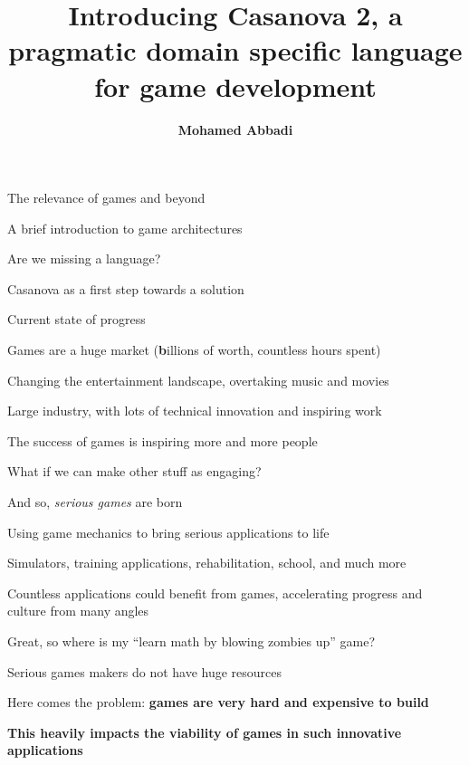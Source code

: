 \documentclass{beamer}
\title{Introducing Casanova 2, a pragmatic domain specific language for game development}
\author{\textbf{Mohamed Abbadi}}
\institute{\textbf{Ca'Foscari University}\\ 
Venice, Italy\\
\textbf{Tilburg University}\\
Tilburg, Netherlands}
\date{}
\begin{document}
\maketitle

\begin{slide}{
\item The relevance of games and beyond
\item A brief introduction to game architectures
\item Are we missing a language?
\item Casanova as a first step towards a solution
\item Current state of progress
}\end{slide}

\begin{slide}{
\item Games are a huge market (\textbf{b}illions of worth, countless hours spent)
\item Changing the entertainment landscape, overtaking music and movies
\item Large industry, with lots of technical innovation and inspiring work
}\end{slide}

\begin{slide}{
\item The success of games is inspiring more and more people
\item What if we can make other stuff as engaging?
\item And so, \textit{serious games} are born
}\end{slide}

\begin{slide}{
\item Using game mechanics to bring serious applications to life
\item Simulators, training applications, rehabilitation, school, and much more
\item Countless applications could benefit from games, accelerating progress and culture from many angles
}\end{slide}

\begin{slide}{
\item Great, so where is my ``learn math by blowing zombies up'' game?
\item Serious games makers do not have huge resources
\item Here comes the problem: \textbf{games are very hard and expensive to build}
\pause
\item \textbf{This heavily impacts the viability of games in such innovative applications}
}\end{slide}
\end{document}
